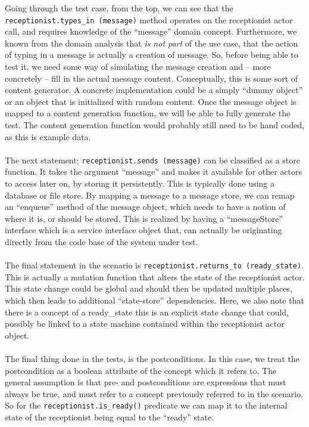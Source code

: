 \documentclass[10pt,a4paper]{article}
\begin{document}
Going through the test case, from the top, we can see that the \texttt{receptionist.types\_in~(message)} method operates on the receptionist actor call, and requires knowledge of the ``message'' domain concept. Furthermore, we known from the domain analysis that \emph{is not part} of the use case, that the action of typing in a message is actually a creation of message. So, before being able to test it, we need some way of simulating the message creation and -- more concretely -- fill in the actual message content. Conceptually, this is some sort of content generator. A concrete implementation could be a simply ``dummy object'' or an object that is initialized with random content. Once the message object is mapped to a content generation function, we will be able to fully generate the test. The content generation function would probably still need to be hand coded, as this is example data.\\\\
The next statement; \texttt{receptionist.sends (message)} can be classified as a store function. It takes the argument ``message'' and makes it available for other actors to access later on, by storing it persistently. This is typically done using a database or file store. By mapping a message to a message store, we can remap an ``enqueue'' method of the message object, which needs to have a notion of where it is, or should be stored. This is realized by having a ``messageStore'' interface which is a service interface object that, can actually be originating directly from the code base of the system under test.\\\\
The final statement in the scenario is \texttt{receptionist.returns\_to (ready\_state)}. This is actually a mutation function that alters the state of the receptionist actor. This state change could be global and should then  be updated multiple places, which then leads to additional ``state-store'' dependencies. Here, we also note that there is a concept of a ready\_state this is an explicit state change that could, possibly be linked to a state machine contained within the receptionist actor object.\\\\
The final thing done in the tests, is the postconditions. In this case, we treat the postcondition as a boolean attribute of the concept which it refers to. The general assumption is that pre- and postconditions are expressions that must always be true, and must refer to a concept previously referred to in the scenario. So for the \texttt{receptionist.is\_ready()} predicate we can map it to the internal state of the receptionist being equal to the ``ready'' state.\\\\
\end{document}

